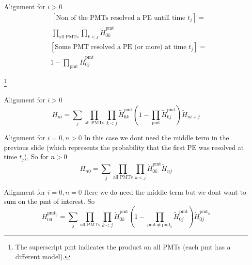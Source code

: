 \documentclass{beamer}
\newcommand\blfootnote[1]{%
  \begingroup
  \renewcommand\thefootnote{}\footnote{#1}%
  \addtocounter{footnote}{-1}%
  \endgroup
}
\begin{document}
\begin{frame}{Alignment for $i>0$}
\begin{equation}
\begin{split}
&[\text{Non of the PMTs resolved a PE untill time }t_j]=\\
&\prod_{\text{all PMTs}}\prod_{k<j}\tilde{H}_{0k}^{\text{pmt}}
\end{split}
\end{equation}
\begin{equation}
\begin{split}
&[\text{Some PMT resolved a PE (or more) at time }t_j]=\\
&1-\prod_{\text{pmt}}\tilde{H}_{0j}^{\text{pmt}}
\end{split}
\end{equation}

\blfootnote{The superscript pmt indicates the product on all PMTs (each pmt has a different model).}
\end{frame}

\begin{frame}{Alignment for $i>0$}
\begin{equation}
H_{ni}=\sum_j\prod_{\text{all PMTs}}\prod_{k<j}\tilde{H}_{0k}^{\text{pmt}}\left(1-\prod_{\text{pmt}}\tilde{H}_{0j}^{\text{pmt}}\right)\tilde{H}_{ni+j}
\end{equation}
\end{frame}

\begin{frame}{Alignment for $i=0, n>0$}
In this case we dont need the middle term in the previous slide (which represents the probability that the first PE was resolved at time $t_j$), So for $n>0$
\begin{equation}
H_{n0}=\sum_j\prod_{\text{all PMTs}}\prod_{k<j}\tilde{H}_{0k}^{\text{pmt}}\tilde{H}_{nj}
\end{equation}
\end{frame}

\begin{frame}{Alignment for $i=0, n=0$}
Here we do need the middle term but we dont want to sum on the pmt of interest. So
\begin{equation}
H_{00}^{\text{pmt}_0}=\sum_j\prod_{\text{all PMTs}}\prod_{k<j}\tilde{H}_{0k}^{\text{pmt}}\left(1-\prod_{\text{pmt}\neq\text{pmt}_0}\tilde{H}_{0j}^{\text{pmt}}\right)\tilde{H}_{0j}^{\text{pmt}_0}
\end{equation}
\end{frame}
\end{document}
